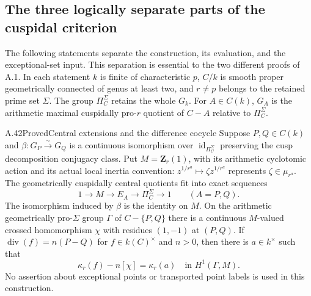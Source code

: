 \subsection{The three logically separate parts of the cuspidal criterion}

The following statements separate the construction, its evaluation,
and the exceptional-set input. This separation is essential to the
two different proofs of A.1. In each statement $k$ is finite of
characteristic $p$, $C/k$ is smooth proper geometrically connected
of genus at least two, and $r\ne p$ belongs to the retained prime
set $\Sigma$. The group $\Pi_C^\Sigma$ retains the whole $G_k$.
For $A\in C(k)$, $G_A$ is the arithmetic maximal cuspidally
pro-$r$ quotient of $C-A$ relative to $\Pi_C^\Sigma$.

\begin{claim}{A.42}{Proved}{Central extensions and the difference cocycle}
Suppose $P,Q\in C(k)$ and
$\beta:G_P\xrightarrow{\sim}G_Q$ is a continuous isomorphism over
$\operatorname{id}_{\Pi_C^\Sigma}$ preserving the cusp decomposition
conjugacy class. Put $M=\mathbf Z_r(1)$, with its arithmetic
cyclotomic action and its actual local inertia convention:
$z^{1/r^a}\mapsto\zeta z^{1/r^a}$ represents $\zeta\in\mu_{r^a}$.
The geometrically cuspidally central quotients
fit into exact sequences
\[
 1\to M\to E_A\to\Pi_C^\Sigma\to1\qquad(A=P,Q).
\]
The isomorphism induced by $\beta$ is the identity on $M$.
On the arithmetic geometrically pro-$\Sigma$ group $\Gamma$ of
$C-\{P,Q\}$ there is a continuous $M$-valued crossed homomorphism
$\chi$ with residues $(1,-1)$ at $(P,Q)$. If
$\operatorname{div}(f)=n(P-Q)$ for $f\in k(C)^\times$ and $n>0$,
then there is $a\in k^\times$ such that
\[
                  \kappa_r(f)-n[\chi]=\kappa_r(a)
                  \quad\text{in }H^1(\Gamma,M).           \tag{A.42.1}
\]
No assertion about exceptional points or transported point labels
is used in this construction.
\end{claim}

